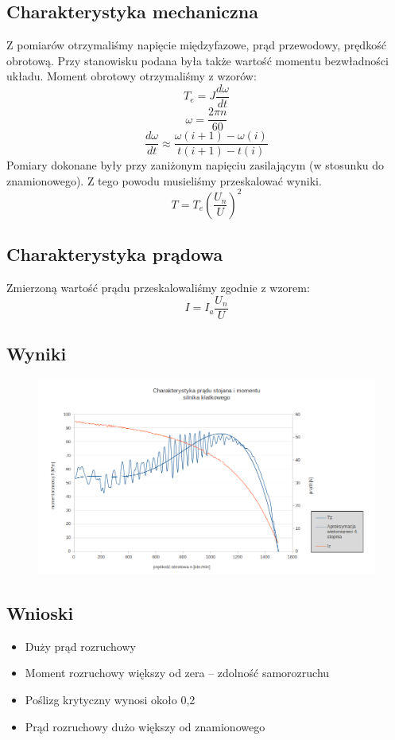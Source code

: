 \documentclass[12pt]{article}
\begin{document}
\subsection{Charakterystyka mechaniczna}
Z pomiarów otrzymaliśmy napięcie międzyfazowe, prąd przewodowy, prędkość obrotową. Przy stanowisku podana była także wartość momentu bezwładności układu. Moment obrotowy otrzymaliśmy z wzorów:
\begin{equation}
	T_e = J\frac{d\omega}{dt}
\end{equation}
\begin{equation}
	\omega=\frac{2\pi n}{60}
\end{equation}
\begin{equation}
	\frac{d\omega}{dt}\approx\frac{\omega(i+1)-\omega(i)}{t(i+1)-t(i)}
\end{equation}
Pomiary dokonane były przy zaniżonym napięciu zasilającym (w stosunku do znamionowego). Z tego powodu musieliśmy przeskalować wyniki.
\begin{equation}
	T=T_e\left(\frac{U_n}{U}\right)^2
\end{equation}
\subsection{Charakterystyka prądowa}
Zmierzoną wartość prądu przeskalowaliśmy zgodnie z wzorem:
\begin{equation}
	I=I_a\frac{U_n}{U}
\end{equation}
\subsection{Wyniki}
	\begin{figure}[H]
	\centering
	\includegraphics[width=13 cm]{ch_klatkowy}
	\end{figure}
\subsection{Wnioski}
\begin{itemize}
\item Duży prąd rozruchowy
\item Moment rozruchowy większy od zera – zdolność samorozruchu
\item Poślizg krytyczny wynosi około 0,2
\item Prąd rozruchowy dużo większy od znamionowego
\end{itemize}
\end{document}
